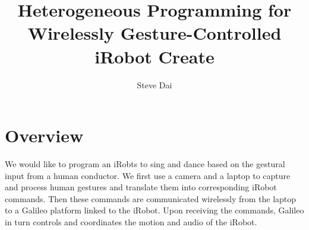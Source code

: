 \documentclass[11pt]{article} %
\title{Heterogeneous Programming for Wirelessly Gesture-Controlled iRobot Create}
\author{Steve Dai}
\begin{document}
\maketitle

\section{Overview}

We would like to program an iRobts to sing and dance based on the gestural input from a human conductor. We first use a camera and a laptop to capture and process human gestures and translate them into corresponding iRobot commands. Then these commands are communicated wirelessly from the laptop to a Galileo platform linked to the iRobot. Upon receiving the commands, Galileo in turn controls and coordinates the motion and audio of the iRobot.
\end{document}
